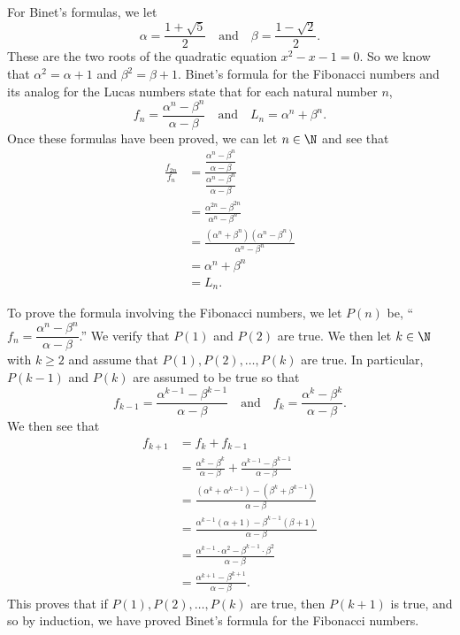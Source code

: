 For Binet's formulas, we let
\[
\alpha = \dfrac{1 + \sqrt{5}}{2}\quad \text{and} \quad \beta = \dfrac{1 - \sqrt{2}}{2}.
\]
These are the two roots of the quadratic equation 
$x^2 - x - 1 = 0$.  So we know that $\alpha^2 = \alpha + 1$ and $\beta^2 = \beta + 1$.  Binet's formula for the Fibonacci numbers and its analog for the Lucas numbers state that for each natural number $n$,
\[
f_n = \frac{\alpha^n - \beta^n}{\alpha - \beta} \quad \text{and} \quad 
L_n = \alpha^n + \beta^n.
\]
Once these formulas have been proved, we can let $n \in \N$ and see that
\begin{align*}
\frac{f_{2n}}{f_n} &= \frac{\dfrac{\alpha^n - \beta^n}{\alpha - \beta}}{\dfrac{\alpha^n - \beta^n}{\alpha - \beta}} \\
       &= \frac{\alpha^{2n} - \beta^{2n}}{\alpha^n - \beta^n} \\
       &= \frac{\left( \alpha^n + \beta^n \right)\left( \alpha^n - \beta^n \right)}{ \alpha^n - \beta^n} \\
       &= \alpha^n + \beta^n \\
       &= L_n.
\end{align*}

To prove the formula involving the Fibonacci numbers, we let $P(n)$ be, 
``$f_n = \dfrac{\alpha^n - \beta^n}{\alpha - \beta}$.''  We verify that $P(1)$ and $P(2)$ are true.  We then let $k \in \N$ with $k \geq 2$ and assume that 
$P(1), P(2), \ldots , P(k)$ are true.  In particular, $P(k-1)$ and $P(k)$ are assumed to be true so that
\[
f_{k-1} = \frac{\alpha^{k-1} - \beta^{k-1}}{\alpha - \beta} \quad \text{and} \quad
f_k = \frac{\alpha^k - \beta^k}{\alpha - \beta}.
\]
We then see that
\begin{align*}
f_{k+1} &= f_k + f_{k-1} \\
        &= \frac{\alpha^k - \beta^k}{\alpha - \beta} + \frac{\alpha^{k-1} - \beta^{k-1}}{\alpha - \beta} \\
        &= \frac{\left( \alpha^k + \alpha^{k-1} \right) - \left( \beta^k + \beta^{k-1} \right)}{\alpha - \beta} \\
        &= \frac{\alpha^{k-1} (\alpha + 1) - \beta^{k-1}(\beta + 1)}{\alpha - \beta} \\
        &= \frac{\alpha^{k-1} \cdot \alpha^2 - \beta^{k-1}\cdot \beta^2}{\alpha - \beta} \\
        &= \frac{\alpha^{k+1} - \beta^{k+1}}{\alpha - \beta}.
\end{align*}
This proves that if $P(1), P(2), \ldots , P(k)$ are true, then $P(k+1)$ is true, and so by induction, we have proved Binet's formula for the Fibonacci numbers.

